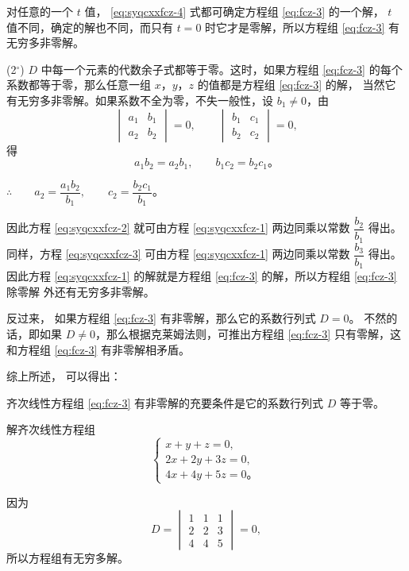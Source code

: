对任意的一个 $t$ 值， \eqref{eq:syqcxxfcz-4} 式都可确定方程组 \eqref{eq:fcz-3} 的一个解，
$t$ 值不同，确定的解也不同，而只有 $t = 0$ 时它才是零解，所以方程组 \eqref{eq:fcz-3} 有无穷多非零解。


(2$^\circ$)  $D$ 中每一个元素的代数余子式都等于零。这时，如果方程组 \eqref{eq:fcz-3}
的每个系数都等于零，那么任意一组 $x$，$y$，$z$ 的值都是方程组 \eqref{eq:fcz-3} 的解，
当然它有无穷多非零解。如果系数不全为零，不失一般性，设 $b_1 \neq 0$，由
$$\begin{vmatrix*}
    a_1 & b_1 \\
    a_2 & b_2
\end{vmatrix*} = 0, \qquad
\begin{vmatrix*}
    b_1 & c_1 \\
    b_2 & c_2
\end{vmatrix*} = 0,
$$
得
$$a_1b_2 = a_2b_1, \qquad b_1c_2 = b_2c_1 \text{。}$$

$\therefore \qquad a_2 = \dfrac{a_1b_2}{b_1}, \qquad c_2 = \dfrac{b_2c_1}{b_1} \text{。}$

因此方程 \eqref{eq:syqcxxfcz-2} 就可由方程 \eqref{eq:syqcxxfcz-1} 两边同乘以常数 $\dfrac{b_2}{b_1}$ 得出。
同样，方程 \eqref{eq:syqcxxfcz-3} 可由方程 \eqref{eq:syqcxxfcz-1} 两边同乘以常数 $\dfrac{b_3}{b_1}$ 得出。
因此方程 \eqref{eq:syqcxxfcz-1} 的解就是方程组 \eqref{eq:fcz-3} 的解，所以方程组 \eqref{eq:fcz-3} 除零解
外还有无穷多非零解。

反过来， 如果方程组 \eqref{eq:fcz-3} 有非零解，那么它的系数行列式 $D = 0$。
不然的话，即如果 $D \neq 0$，那么根据克莱姆法则，可推出方程组 \eqref{eq:fcz-3}
只有零解，这和方程组 \eqref{eq:fcz-3} 有非零解相矛盾。

综上所述， 可以得出：

\begin{theorem}\label{theorem:syqcxxfcz-1}
    齐次线性方程组 \eqref{eq:fcz-3} 有非零解的充要条件是它的系数行列式 $D$ 等于零。
\end{theorem}


\liti 解齐次线性方程组
$$\begin{cases}
    x + y + z = 0, \\
    2x + 2y + 3z = 0, \\
    4x + 4y + 5z = 0 \text{。}
\end{cases}$$

\jie 因为
$$D = \begin{vmatrix*}
	1 & 1 & 1 \\
	2 & 2 & 3 \\
	4 & 4 & 5
\end{vmatrix*} = 0,$$
所以方程组有无穷多解。

